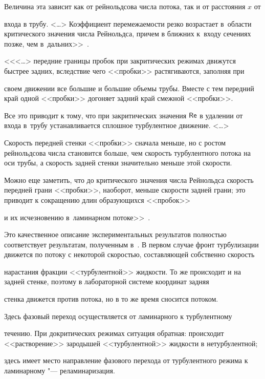 Величина эта зависит как от рейнольдсова числа потока, так и от расстояния $x$ от

входа в трубу. <\dots> Коэффициент перемежаемости резко возрастает в~области критического значения числа Рейнольдса, причем в ближних к~входу сечениях позже, чем в~дальних>>~\cite[с.~525, 526]{lukashev:bib53}. 



<<<\dots> передние границы пробок при закритических режимах движутся быстрее задних, вследствие чего <<пробки>> растягиваются, заполняя при

своем движении все большие и большие объемы трубы. Вместе с тем передний край одной <<пробки>> догоняет задний край смежной <<пробки>>.

Все это приводит к тому, что при закритических значения $\sf Re$ в удалении от входа в~трубу устанавливается сплошное турбулентное движение. <\dots>



Скорость передней стенки <<пробки>> сначала меньше, но с ростом рейнольдсова числа становится больше, чем скорость турбулентного потока на оси трубы, а скорость задней стенки значительно меньше этой скорости. 

Можно еще заметить, что до критического значения числа Рейнольдса скорость передней грани <<пробки>>, наоборот, меньше скорости задней грани; это приводит к сокращению длин образующихся <<пробок>>

и их исчезновению в~ламинарном потоке>>~\cite[с.~527]{lukashev:bib53}.



Это качественное описание экспериментальных результатов \cite{lukashev:bib53} полностью соответствует результатам, полученным в~\cite{lukashev:bib50}. В первом случае фронт турбулизации движется по потоку с некоторой скоростью, составляющей собственно скорость

нарастания фракции <<турбулентной>> жидкости. То же происходит и на задней стенке, поэтому в лабораторной системе координат задняя

стенка движется против потока, но в то же время сносится потоком. 

Здесь фазовый переход осуществляется от ламинарного к турбулентному

течению. При докритических режимах ситуация обратная: происходит <<растворение>> зародышей <<турбулентной>> жидкости в нетурбулентной;

здесь имеет место  направление фазового перехода от турбулентного режима к ламинарному "--- реламинаризация.



